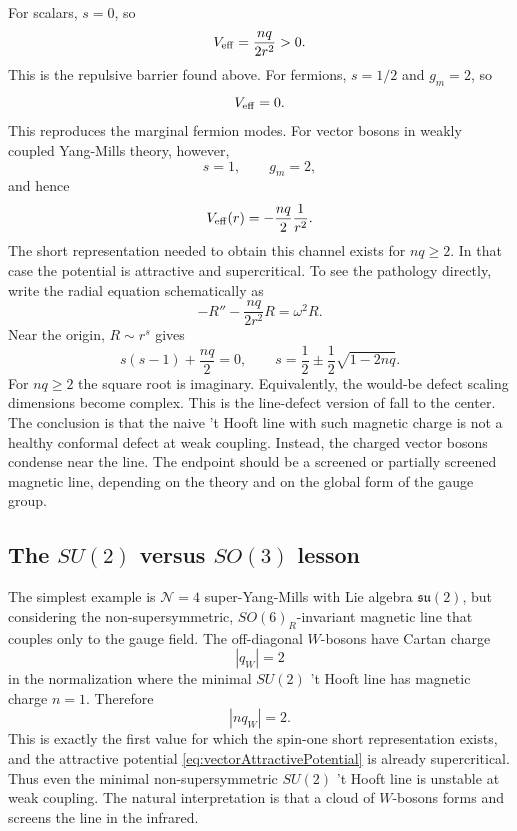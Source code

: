 \documentclass[11pt]{article}
\begin{document}
For scalars, $s=0$, so
\begin{equation}
  V_{\rm eff}=\frac{nq}{2r^2}>0 .
\end{equation}
This is the repulsive barrier found above.  For fermions, $s=1/2$ and $g_m=2$, so
\begin{equation}
  V_{\rm eff}=0 .
\end{equation}
This reproduces the marginal fermion modes.  For vector bosons in weakly coupled Yang-Mills theory, however,
\begin{equation}
  s=1,
  \qquad g_m=2,
\end{equation}
and hence
\begin{equation}
  V_{\rm eff}(r)=-\frac{nq}{2}\frac{1}{r^2} .
  \label{eq:vectorAttractivePotential}
\end{equation}
The short representation needed to obtain this channel exists for $nq\ge2$.  In that case the potential is attractive and supercritical.  To see the pathology directly, write the radial equation schematically as
\begin{equation}
  -R''-\frac{nq}{2r^2}R=\omega^2R .
\end{equation}
Near the origin, $R\sim r^s$ gives
\begin{equation}
  s(s-1)+\frac{nq}{2}=0,
  \qquad
  s=\frac12\pm\frac12\sqrt{1-2nq} .
\end{equation}
For $nq\ge2$ the square root is imaginary.  Equivalently, the would-be defect scaling dimensions become complex.  This is the line-defect version of fall to the center.  The conclusion is that the naive 't Hooft line with such magnetic charge is not a healthy conformal defect at weak coupling.  Instead, the charged vector bosons condense near the line.  The endpoint should be a screened or partially screened magnetic line, depending on the theory and on the global form of the gauge group.

\subsection{The \texorpdfstring{$SU(2)$}{SU(2)} versus
\texorpdfstring{$SO(3)$}{SO(3)} lesson}

The simplest example is $\mathcal N=4$ super-Yang-Mills with Lie algebra $\mathfrak{su}(2)$, but considering the non-supersymmetric, $SO(6)_R$-invariant magnetic line that couples only to the gauge field.  The off-diagonal $W$-bosons have Cartan charge
\begin{equation}
  |q_W|=2
\end{equation}
in the normalization where the minimal $SU(2)$ 't Hooft line has magnetic charge $n=1$.  Therefore
\begin{equation}
  |nq_W|=2 .
\end{equation}
This is exactly the first value for which the spin-one short representation exists, and the attractive potential \eqref{eq:vectorAttractivePotential} is already supercritical.  Thus even the minimal non-supersymmetric $SU(2)$ 't Hooft line is unstable at weak coupling.  The natural interpretation is that a cloud of $W$-bosons forms and screens the line in the infrared.
\end{document}
